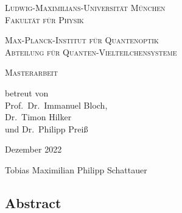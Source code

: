 \begin{titlepage}
    \vspace*{\fill}
    \centering

    \textsc{\Large Ludwig-Maximilians-Universität München}\\
    \textsc{Fakultät für Physik}

    \vspace{1cm}

    \textsc{\Large Max-Planck-Institut für Quantenoptik}\\
    \textsc{Abteilung für Quanten-Vielteilchensysteme}

    \vspace{2.3cm}

    \begin{doublespace}
        \textsc{ \Huge \titleDE}
    \end{doublespace}


    \vspace{2.3cm}
    \huge \textsc{Masterarbeit}



    \vspace{0.3cm}
    \large \textrm{betreut von\\Prof.~Dr.~Immanuel Bloch,\\Dr.~Timon Hilker\\und Dr.~Philipp Preiß}

    \vspace{1.5cm}
    \huge
    \textrm{Dezember 2022}

    \vspace{1.5cm}
    \Large \textrm{Tobias Maximilian Philipp Schattauer}

    \vspace*{\fill}
\end{titlepage}

\begin{titlepage}
    \null\vspace{3cm}
    \centering
    \begin{minipage}{0.8\textwidth}
        \section*{Abstract}
        
    \end{minipage}
\end{titlepage}



\tableofcontents
\newpage
